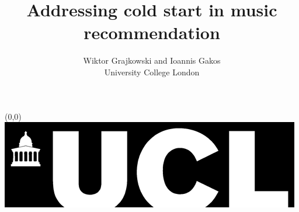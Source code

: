 \documentclass[a0]{a0poster}
\title{Addressing cold start in music recommendation}
\author{Wiktor Grajkowski and Ioannis Gakos\\ University College London}
\begin{document}
  \begin{textblock}{23}(0,0)
  \vspace*{-48mm}\hspace*{-42mm}%
  \includegraphics{ucl_bar_black.eps}
  \begin{minipage}{1191mm}		%
  \vspace{-20cm}
  \maketitle
  \end{minipage}
  \end{textblock}

\end{document}
